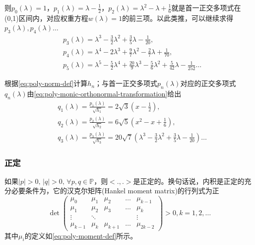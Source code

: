 \begin{subappendices}
则$p_0(\lambda)=1$，$p_1(\lambda)= \lambda - \frac{1}{2}$，$p_2(\lambda)=\lambda^2 - \lambda + \frac{1}{6}$就是首一正交多项式在(0,1)区间内，对应权重方程$w(\lambda)=1$的前三项。以此类推，可以继续求得$p_3(\lambda),p_4(\lambda) \ldots$
\begin{equation*}
  \begin{split}
    &p_3(\lambda) = \lambda^3 - \frac{3}{2} \lambda^2 + \frac{3}{5}\lambda - \frac{1}{20}, \\
    &p_4(\lambda) = \lambda^4 - 2 \lambda^3 + \frac{9}{7}\lambda^2 - \frac{2}{7} \lambda + \frac{1}{70}, \\
    &p_5(\lambda) = \lambda^5 - \frac{5}{2} \lambda^4 + \frac{20}{9} \lambda^3 - \frac{5}{6} \lambda^2 + \frac{5}{42} \lambda - \frac{1}{252} \ldots
  \end{split}
\end{equation*}

根据\eqref{eq:poly-norm-def}计算$h_n$；与首一正交多项式$p_n(\lambda)$对应的正交多项式$q_n(\lambda)$由\eqref{eq:poly-monic-orthonormal-transformation}给出
\begin{equation*}
  \begin{split}
    &q_1(\lambda) = \frac{p_1(\lambda)}{\sqrt{h_1}} = 2\sqrt{3} \left( x - \frac{1}{2} \right), \\
    &q_2(\lambda) = \frac{p_2(\lambda)}{\sqrt{h_2}} = 6 \sqrt{5} \left( x^2 - x + \frac{1}{6} \right), \\
    &q_3(\lambda) = \frac{p_3(\lambda)}{\sqrt{h_3}} = 20 \sqrt{7} \left( \lambda^3 - \frac{3}{2} \lambda^2 + \frac{3}{5}\lambda - \frac{1}{20} \right) \ldots
  \end{split}
\end{equation*}






















\subsubsection{正定}
如果$\left| p \right| >0, \, \left| q \right| >0, \, \forall p,q \in \mathbb{P}$，则$<.,.>$是正定的。换句话说，内积是正定的充分必要条件为，它的汉克尔矩阵(Hankel moment matrix)的行列式为正
\begin{equation}
  \label{eq:poly-hankel-moment-matrix-def}
  \det
  \begin{pmatrix}
    \mu_0 & \mu_1 & \mu_2 & \dots &\mu_{k-1} \\
    \mu_1 & \mu_2 & \mu_3 & \dots & \mu_k \\
    \vdots & \ddots & & & \vdots \\
    \mu_{k-1} & \mu_k & \mu_{k+1} & \dots & \mu_{2k-2}
  \end{pmatrix} >0, k=1,2,\ldots
\end{equation}
其中$\mu_i$的定义如\eqref{eq:poly-moment-def}所示。


\end{subappendices}
